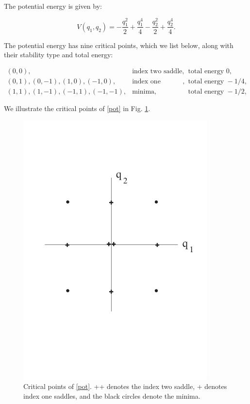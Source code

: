 \documentclass{article}
\begin{document}
\noindent
The potential energy is given by:

\begin{equation}
V(q_1, q_2) =  - \frac{q_1^2}{2} + \frac{q_1^4}{4}- \frac{q_2^2}{2} + \frac{q_2^4}{4}.
\label{pot}
\end{equation}

\noindent
The potential energy has nine critical points, which we list below, along with their stability type and total energy:

\begin{equation}
\begin{array}{cll}
(0,0), & \mbox{index two saddle}, & \mbox{total energy} \, \, 0,\\
(0,1), (0, -1), (1, 0), (-1, 0), & \mbox{index one saddles}, & \mbox{total energy} \, \,-{1}/{4} ,\\
(1, 1), (1, -1), (-1, 1), (-1, -1), & \mbox{minima}, & \mbox{total energy} \, \, -{1}/{2},
\end{array}
\end{equation}

\noindent
We illustrate the critical points of \eqref{pot} in Fig. \ref{fig:global DS 2}.

\begin{figure}[htb!]
\begin{center}
\includegraphics[width=10.0cm]{global_DS_2.png}
\end{center}
\caption{Critical points of \eqref{pot}. ++ denotes the index two saddle, + denotes index one saddles, and the black circles denote the minima.}
\label{fig:global DS 2}
\end{figure}
\end{document}
